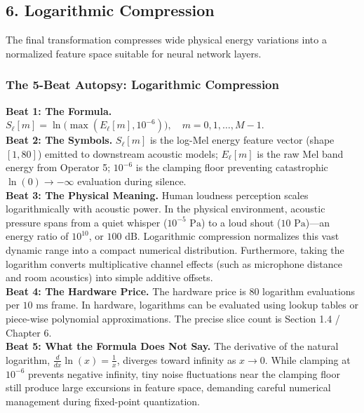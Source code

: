 \documentclass[11pt,a4paper]{article}
\begin{document}
\clearpage

\vspace*{-4.5mm}
\subsection*{6. Logarithmic Compression}
\vspace{-2mm}

The final transformation compresses wide physical energy variations into a normalized feature space suitable for neural network layers.

\subsubsection*{The 5-Beat Autopsy: Logarithmic Compression}
\vspace{-2mm}
{\small
\textbf{Beat 1: The Formula.} $S_\ell[m] = \ln\bigl(\max(E_\ell[m], 10^{-6})\bigr), \quad m = 0, 1, \dots, M-1$.\\[1mm]
\textbf{Beat 2: The Symbols.} $S_\ell[m]$ is the log-Mel energy feature vector (shape $[1, 80]$) emitted to downstream acoustic models; $E_\ell[m]$ is the raw Mel band energy from Operator 5; $10^{-6}$ is the clamping floor preventing catastrophic $\ln(0) \to -\infty$ evaluation during silence.\\[1mm]
\textbf{Beat 3: The Physical Meaning.} Human loudness perception scales logarithmically with acoustic power. In the physical environment, acoustic pressure spans from a quiet whisper ($10^{-5}\text{ Pa}$) to a loud shout ($10\text{ Pa}$)---an energy ratio of $10^{10}$, or $100\text{ dB}$. Logarithmic compression normalizes this vast dynamic range into a compact numerical distribution. Furthermore, taking the logarithm converts multiplicative channel effects (such as microphone distance and room acoustics) into simple additive offsets.\\[1mm]
\textbf{Beat 4: The Hardware Price.} The hardware price is 80 logarithm evaluations per $10\text{ ms}$ frame. In hardware, logarithms can be evaluated using lookup tables or piece-wise polynomial approximations. The precise slice count is Section 1.4 / Chapter 6.\\[1mm]
\textbf{Beat 5: What the Formula Does Not Say.} The derivative of the natural logarithm, $\frac{d}{dx}\ln(x) = \frac{1}{x}$, diverges toward infinity as $x \to 0$. While clamping at $10^{-6}$ prevents negative infinity, tiny noise fluctuations near the clamping floor still produce large excursions in feature space, demanding careful numerical management during fixed-point quantization.
}
\end{document}
